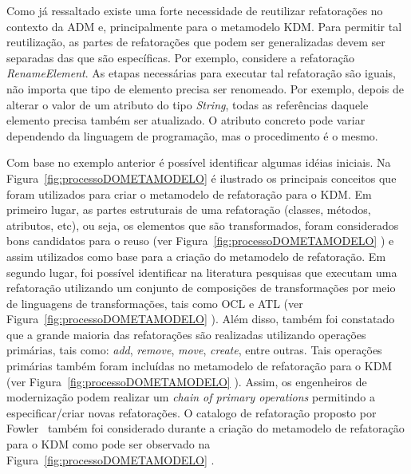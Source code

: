 Como já ressaltado existe uma forte necessidade de reutilizar refatorações no contexto da ADM e, principalmente para o metamodelo KDM. Para permitir tal reutilização, as partes de refatorações que podem ser generalizadas devem ser separadas das que são específicas. Por exemplo, considere a refatoração \textit{RenameElement}. As etapas necessárias para executar tal refatoração são iguais, não importa que tipo de elemento precisa ser renomeado. Por exemplo, depois de alterar o valor de um atributo do tipo \textit{String}, todas as referências daquele elemento precisa também ser atualizado. O atributo concreto pode variar dependendo da linguagem de programação, mas o procedimento é o mesmo.	

Com base no exemplo anterior é possível identificar algumas idéias iniciais. Na Figura~\ref{fig:processoDOMETAMODELO} é ilustrado os principais conceitos que foram utilizados para criar o metamodelo de refatoração para o KDM. Em primeiro lugar, as partes estruturais de uma refatoração (classes, métodos, atributos, etc), ou seja, os elementos que são transformados, foram considerados bons candidatos para o reuso (ver Figura~\ref{fig:processoDOMETAMODELO} ) e assim utilizados como base para a criação do metamodelo de refatoração. Em segundo lugar, foi possível identificar na literatura pesquisas que executam uma refatoração utilizando um conjunto de composições de transformações por meio de linguagens de transformações, tais como OCL e ATL (ver Figura~\ref{fig:processoDOMETAMODELO} ). Além disso, também foi constatado que a grande maioria das refatorações são realizadas utilizando operações primárias, tais como: \textit{add}, \textit{remove}, \textit{move}, \textit{create}, entre outras. Tais operações primárias também foram incluídas no metamodelo de refatoração para o KDM (ver Figura~\ref{fig:processoDOMETAMODELO} ). Assim, os engenheiros de modernização podem realizar um \textit{chain of primary operations} permitindo a especificar/criar novas refatorações. O catalogo de refatoração proposto por Fowler~\citep{refactImpro} também foi considerado durante a criação do metamodelo de refatoração para o KDM como pode ser observado na Figura~\ref{fig:processoDOMETAMODELO} .


